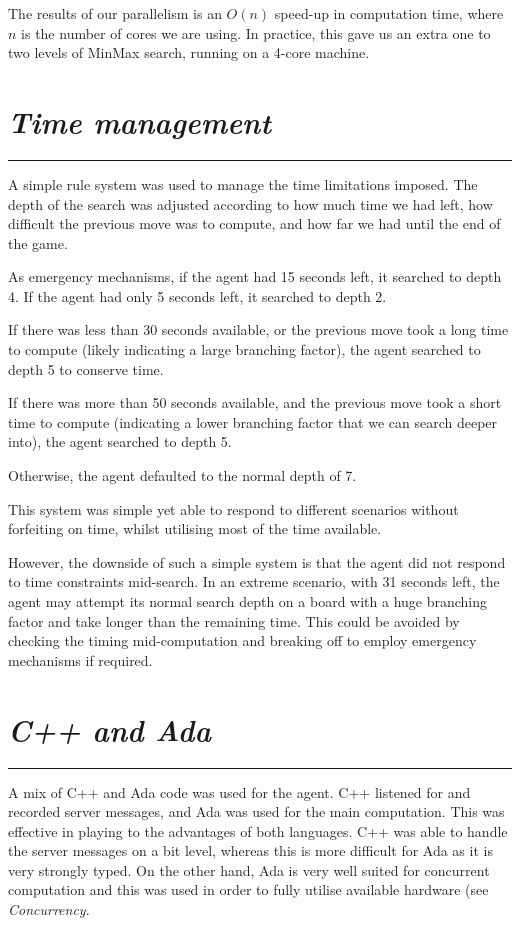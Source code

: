 \documentclass[10pt]{report}
\begin{document}
\begin{multicols}{2}
The results of our parallelism is an $O(n)$ speed-up in computation time, where $n$ is the number of cores we are using. In practice, this gave us an extra one to two levels of MinMax search, running on a 4-core machine.
\section*{\emph{Time management}}
\hrule

A simple rule system was used to manage the time limitations imposed. The depth of the search was adjusted according to how much time we had left, how difficult the previous move was to compute, and how far we had until the end of the game.

As emergency mechanisms, if the agent had 15 seconds left, it searched to depth 4. If the agent had only 5 seconds left, it searched to depth 2.

If there was less than 30 seconds available, or the previous move took a long time to compute (likely indicating a large branching factor), the agent searched to depth 5 to conserve time.

If there was more than 50 seconds available, and the previous move took a short time to compute (indicating a lower branching factor that we can search deeper into), the agent searched to depth 5.

Otherwise, the agent defaulted to the normal depth of 7.

This system was simple yet able to respond to different scenarios without forfeiting on time, whilst utilising most of the time available.

However, the downside of such a simple system is that the agent did not respond to time constraints mid-search. In an extreme scenario, with 31 seconds left, the agent may attempt its normal search depth on a board with a huge branching factor and take longer than the remaining time. This could be avoided by checking the timing mid-computation and breaking off to employ emergency mechanisms if required.
\section*{\emph{C++ and Ada}}
\hrule
A mix of C++ and Ada code was used for the agent. C++ listened for and recorded server messages, and Ada was used for the main computation. This was effective in playing to the advantages of both languages. C++ was able to handle the server messages on a bit level, whereas this is more difficult for Ada as it is very strongly typed. On the other hand, Ada is very well suited for concurrent computation and this was used in order to fully utilise available hardware (see \emph{Concurrency}.


\end{multicols}
\end{document}
